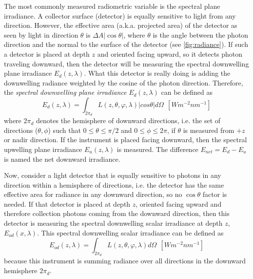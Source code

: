 The most commonly measured radiometric variable is the spectral plane irradiance. A collector surface (detector) is equally sensitive to light from any direction. However, the effective area (a.k.a. projected area) of the detector as seen by light in direction $\theta$ is $\Delta A|\cos{\theta}|$, where $\theta$ is the angle between the photon direction and the normal to the surface of the detector (see \autoref{fig:radiance}). If such a detector is placed at depth $z$ and oriented facing upward, so it detects photon traveling downward, then the detector will be measuring the spectral downwelling plane irradiance $E_d(z,\lambda)$. What this detector is really doing is adding the downwelling radiance weighted by the cosine of the photon direction. Therefore, the {\it spectral downwelling plane irradiance} $E_d(z,\lambda)$ can be defined as
\begin{equation}
  E_{d}(z,\lambda)=\int_{2\pi_d} L(z,\theta,\varphi,\lambda)|cos\theta|d\Omega~~\left[Wm^{-2}nm^{-1} \right]
\end{equation}
where $2\pi_d$ denotes the hemisphere of downward directions, i.e. the set of directions ($\theta,\phi$) such that $0\leq\theta\leq\pi/2$ and $0\leq\phi\leq2\pi$, if $\theta$ is measured from $+z$ or nadir direction. If the instrument is placed facing downward, then the spectral upwelling plane irradiance $E_u(z,\lambda)$ is measured. The difference $E_{net}=E_d-E_u$ is named the net downward irradiance.

Now, consider a light detector that is equally sensitive to photons in any direction within a hemisphere of directions, i.e. the detector has the same effective area for radiance in any downward direction, so no $\cos{\theta}$ factor is needed. If that detector is placed at depth $z$, oriented facing upward and therefore collection photons coming from the downward direction, then this detector is measuring the spectral downwelling scalar irradiance at depth $z$, $E_{od}(x,\lambda)$. This spectral downwelling scalar irradiance can be defined as
\begin{equation}\label{eq:Eod}
  E_{od}(z,\lambda)=\int_{2\pi_d} L(z,\theta,\varphi,\lambda)d\Omega~~\left[Wm^{-2}nm^{-1} \right]
\end{equation}
because this instrument is summing radiance over all directions in the downward hemisphere $2\pi_d$.

